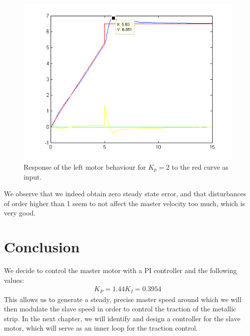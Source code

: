 %
\begin{figure}[htbp]
\centering
\includegraphics[width = .7\textwidth]{pics/LM_KP200.png}
\caption{Response of the left motor behaviour for $K_p = 2$ to the red curve as input.}
\label{fig:LM_KP200}
\end{figure}

We observe that we indeed obtain zero steady state error, and that disturbances of order higher than 1 seem to not affect the master velocity too much, which is very good.
\section{Conclusion}
We decide to control the master motor with a PI controller and the following values:
\begin{align*}
	K_P = 1.44
	K_I = 0.3954
\end{align*}
This allows us to generate a steady, precise master speed around which we will then modulate the slave speed in order to control the traction of the metallic strip. In the next chapter, we will identify and design a controller for the slave motor, which will serve as an inner loop for the traction control.
